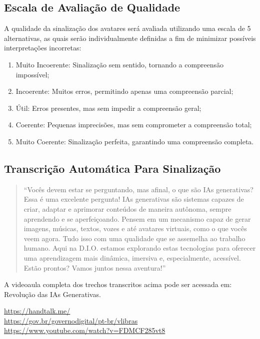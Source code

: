 \subsection{Escala de Avaliação de Qualidade}

A qualidade da sinalização dos avatares será avaliada utilizando uma escala de 5 
alternativas, as quais serão individualmente definidas a fim de minimizar possíveis 
interpretações incorretas:

\begin{enumerate}
    \item Muito Incoerente: Sinalização sem sentido, tornando a compreensão impossível;
    \item Incoerente: Muitos erros, permitindo apenas uma compreensão parcial;
    \item Útil: Erros presentes, mas sem impedir a compreensão geral;
    \item Coerente: Pequenas imprecisões, mas sem comprometer a compreensão total;
    \item Muito Coerente: Sinalização perfeita, garantindo uma compreensão completa.
\end{enumerate}

\subsection{Transcrição Automática Para Sinalização}

\begin{quote}
“Vocês devem estar se perguntando, mas afinal, o que são IAs generativas? Essa é uma 
excelente pergunta!
IAs generativas são sistemas capazes de criar, adaptar e aprimorar conteúdos de maneira 
autônoma, sempre aprendendo e se aperfeiçoando.
Pensem em um mecanismo capaz de gerar imagens, músicas, textos, vozes e até avatares 
virtuais, como o que vocês veem agora. Tudo isso com uma qualidade que se assemelha ao 
trabalho humano.
Aqui na D.I.O. estamos explorando estas tecnologias para oferecer uma aprendizagem mais 
dinâmica, imersiva e, especialmente, acessível.
Estão prontos? Vamos juntos nessa aventura!”
\end{quote}

A videoaula completa dos trechos transcritos acima pode ser acessada em: 
Revolução das IAs Generativas.

\url{https://handtalk.me/} \\
\url{https://gov.br/governodigital/pt-br/vlibras} \\
\url{https://www.youtube.com/watch?v=FDMCF285vt8}


